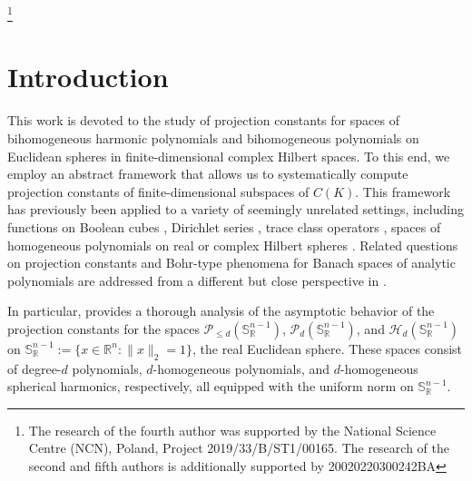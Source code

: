\documentclass[12pt]{amsart}
\numberwithin{subsection}{section}
\theoremstyle{definition}
\theoremstyle{remark}
\begin{document}
\date{}

\thanks{The research of the fourth author was supported by the National Science Centre (NCN), Poland, Project 2019/33/B/ST1/00165. The research of the second and fifth authors is additionally supported by 20020220300242BA}


\maketitle


\maketitle




\section{Introduction}



This work is devoted to the study of projection constants for spaces of bihomogeneous
harmonic polynomials and bihomogeneous polynomials on Euclidean spheres in
finite-dimensional complex Hilbert spaces. To this end, we employ an abstract framework
that allows us to systematically compute projection constants of finite-dimensional
subspaces of $C(K)$. This framework has previously been applied to a variety of seemingly
unrelated settings, including functions on Boolean cubes \cite{defant2023asymptotic},
Dirichlet series \cite{defant2024projection}, trace class operators
\cite{defant2023integral}, spaces of homogeneous polynomials on real or complex Hilbert spheres
\cite{defant2024minimal, ryll1983homogeneous}. Related questions on projection constants and Bohr-type phenomena
for Banach spaces of analytic polynomials are addressed from a different but close perspective in
\cite{zdefant2025local}.



In particular, \cite{defant2024minimal} provides a thorough analysis of the asymptotic behavior of the projection constants for the spaces  $\mathcal{P}_{\leq d}(\mathbb{S}_{\mathbb{R}}^{n-1}) $,  $\mathcal{P}_d(\mathbb{S}_{\mathbb{R}}^{n-1}) $, and  $\mathcal{H}_d(\mathbb{S}_{\mathbb{R}}^{n-1}) $ on    $\mathbb{S}_{\mathbb{R}}^{n-1}:= \{x \in \mathbb{R}^n : \|x\|_2 = 1\} $, the real Euclidean  sphere. These spaces consist of degree-$d$ polynomials, $d$-homogeneous polynomials, and $d$-homogeneous spherical harmonics, respectively, all equipped with the uniform norm on $\mathbb{S}^{n-1}_{\mathbb{R}}$.
\end{document}
